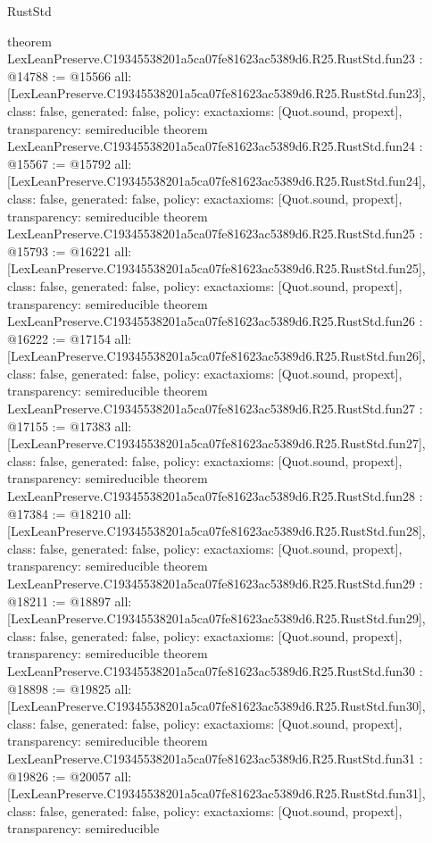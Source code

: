 \begin{lexlean}{RustStd}
\begin{coremodule}
{}
theorem LexLeanPreserve.C19345538201a5ca07fe81623ac5389d6.R25.RustStd.fun23 : @14788 := @15566 {
  all: [LexLeanPreserve.C19345538201a5ca07fe81623ac5389d6.R25.RustStd.fun23],
  class: false,
  generated: false,
  policy: exact{axioms: [Quot.sound, propext]},
  transparency: semireducible
}
theorem LexLeanPreserve.C19345538201a5ca07fe81623ac5389d6.R25.RustStd.fun24 : @15567 := @15792 {
  all: [LexLeanPreserve.C19345538201a5ca07fe81623ac5389d6.R25.RustStd.fun24],
  class: false,
  generated: false,
  policy: exact{axioms: [Quot.sound, propext]},
  transparency: semireducible
}
theorem LexLeanPreserve.C19345538201a5ca07fe81623ac5389d6.R25.RustStd.fun25 : @15793 := @16221 {
  all: [LexLeanPreserve.C19345538201a5ca07fe81623ac5389d6.R25.RustStd.fun25],
  class: false,
  generated: false,
  policy: exact{axioms: [Quot.sound, propext]},
  transparency: semireducible
}
theorem LexLeanPreserve.C19345538201a5ca07fe81623ac5389d6.R25.RustStd.fun26 : @16222 := @17154 {
  all: [LexLeanPreserve.C19345538201a5ca07fe81623ac5389d6.R25.RustStd.fun26],
  class: false,
  generated: false,
  policy: exact{axioms: [Quot.sound, propext]},
  transparency: semireducible
}
theorem LexLeanPreserve.C19345538201a5ca07fe81623ac5389d6.R25.RustStd.fun27 : @17155 := @17383 {
  all: [LexLeanPreserve.C19345538201a5ca07fe81623ac5389d6.R25.RustStd.fun27],
  class: false,
  generated: false,
  policy: exact{axioms: [Quot.sound, propext]},
  transparency: semireducible
}
theorem LexLeanPreserve.C19345538201a5ca07fe81623ac5389d6.R25.RustStd.fun28 : @17384 := @18210 {
  all: [LexLeanPreserve.C19345538201a5ca07fe81623ac5389d6.R25.RustStd.fun28],
  class: false,
  generated: false,
  policy: exact{axioms: [Quot.sound, propext]},
  transparency: semireducible
}
theorem LexLeanPreserve.C19345538201a5ca07fe81623ac5389d6.R25.RustStd.fun29 : @18211 := @18897 {
  all: [LexLeanPreserve.C19345538201a5ca07fe81623ac5389d6.R25.RustStd.fun29],
  class: false,
  generated: false,
  policy: exact{axioms: [Quot.sound, propext]},
  transparency: semireducible
}
theorem LexLeanPreserve.C19345538201a5ca07fe81623ac5389d6.R25.RustStd.fun30 : @18898 := @19825 {
  all: [LexLeanPreserve.C19345538201a5ca07fe81623ac5389d6.R25.RustStd.fun30],
  class: false,
  generated: false,
  policy: exact{axioms: [Quot.sound, propext]},
  transparency: semireducible
}
theorem LexLeanPreserve.C19345538201a5ca07fe81623ac5389d6.R25.RustStd.fun31 : @19826 := @20057 {
  all: [LexLeanPreserve.C19345538201a5ca07fe81623ac5389d6.R25.RustStd.fun31],
  class: false,
  generated: false,
  policy: exact{axioms: [Quot.sound, propext]},
  transparency: semireducible
}
\end{coremodule}
\end{lexlean}
